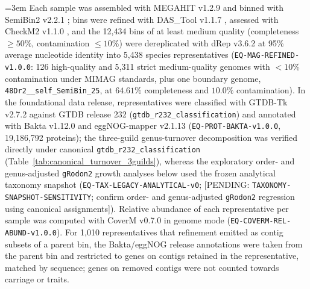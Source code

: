 {\emergencystretch=3em
Each sample was assembled with MEGAHIT v1.2.9 \citep{li2015megahit} and binned with SemiBin2 v2.2.1
\citep{pan2023semibin2}; bins were refined with DAS\_Tool v1.1.7 \citep{sieber2018dastool}, assessed with
CheckM2 v1.1.0 \citep{chklovski2023checkm2}, and the 12{,}434 bins of at least medium quality
(completeness $\geq 50\%$, contamination $\leq 10\%$) were dereplicated with dRep v3.6.2
\citep{olm2017drep} at 95\% average nucleotide identity into 5{,}438 species representatives (\texttt{EQ-\allowbreak MAG-\allowbreak REFINED-\allowbreak v1.0.0}: 126 high-quality and 5{,}311 strict medium-quality genomes with $<10\%$ contamination under MIMAG standards, plus one boundary genome, \texttt{48Dr2\_\_\allowbreak self\_\allowbreak SemiBin\_25}, at $64.61\%$ completeness and $10.0\%$ contamination).
In the foundational data release, representatives were classified with GTDB-Tk v2.7.2 \citep{chaumeil2022gtdbtk} against GTDB release 232
\citep{parks2022gtdb} (\texttt{gtdb\_\allowbreak r232\_\allowbreak classification}) and annotated with Bakta v1.12.0 \citep{schwengers2021bakta} and eggNOG-mapper
v2.1.13 \citep{cantalapiedra2021eggnog} (\texttt{EQ-\allowbreak PROT-\allowbreak BAKTA-\allowbreak v1.0.0}, 19{,}186{,}792 proteins); the three-guild genus-turnover decomposition was verified directly under canonical \texttt{gtdb\_\allowbreak r232\_\allowbreak classification} (Table~\ref{tab:canonical_turnover_3guilds}), whereas the exploratory order- and genus-adjusted \texttt{gRodon2} growth analyses below used the frozen analytical taxonomy snapshot (\texttt{EQ-\allowbreak TAX-\allowbreak LEGACY-\allowbreak ANALYTICAL-\allowbreak v0}; [PENDING: \texttt{TAXONOMY-\allowbreak SNAPSHOT-\allowbreak SENSITIVITY}; confirm order- and genus-adjusted \texttt{gRodon2} regression using canonical assignments]). Relative abundance of each representative per sample was
computed with CoverM v0.7.0 \citep{aroney2025coverm} in genome mode (\texttt{EQ-\allowbreak COVERM-\allowbreak REL-\allowbreak ABUND-\allowbreak v1.0.0}). For 1{,}010 representatives that
refinement emitted as contig subsets of a parent bin, the Bakta/eggNOG release annotations were taken from the parent bin and
restricted to genes on contigs retained in the representative, matched by sequence; genes on removed
contigs were not counted towards carriage or traits.\par}

